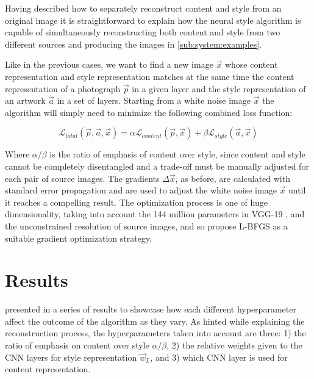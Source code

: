Having described how to separately reconstruct content and style from an original image it is straightforward to explain how the neural style algorithm is capable of simultaneously reconstructing both content and style from two different sources and producing the images in \autoref{sub:system:examples}.

Like in the previous cases, we want to find a new image $\vec{x}$ whose content representation and style representation matches at the same time the content representation of a photograph $\vec{p}$ in a given layer and the style representation of an artwork $\vec{a}$ in a set of layers.
Starting from a white noise image $\vec{x}$ the algorithm will simply need to minimize the following combined loss function:

\begin{equation}
  \mathcal{L}_{total}(\vec{p}, \vec{a}, \vec{x}) =
    \alpha \mathcal{L}_{content}(\vec{p}, \vec{x}) +
    \beta \mathcal{L}_{style}(\vec{a}, \vec{x})
\end{equation}

Where $\alpha/\beta$ is the ratio of emphasis of content over style, since content and style cannot be completely disentangled and a trade-off must be manually adjusted for each pair of source images.
The gradients $\Delta \vec{x}$, as before, are calculated with standard error propagation and are used to adjust the white noise image $\vec{x}$ until it reaches a compelling result.
The optimization process is one of huge dimensionality, taking into account the 144 million parameters in VGG-19 \cite{Simonyan2014}, and the unconstrained resolution of source images, and so \citeauthor{Gatys2015A} propose L-BFGS \cite{Zhu1994} as a suitable gradient optimization strategy.



\section{Results}
\label{sec:system:results}


\citeauthor{Gatys2015B} presented in \cite{Gatys2015B} a series of results to showcase how each different hyperparameter affect the outcome of the algorithm as they vary.
As hinted while explaining the reconstruction process, the hyperparameters taken into account are three: 1) the ratio of emphasis on content over style $\alpha / \beta$, 2) the relative weights given to the CNN layers for style representation $\vec{w}_L$, and 3) which CNN layer is used for content representation.

